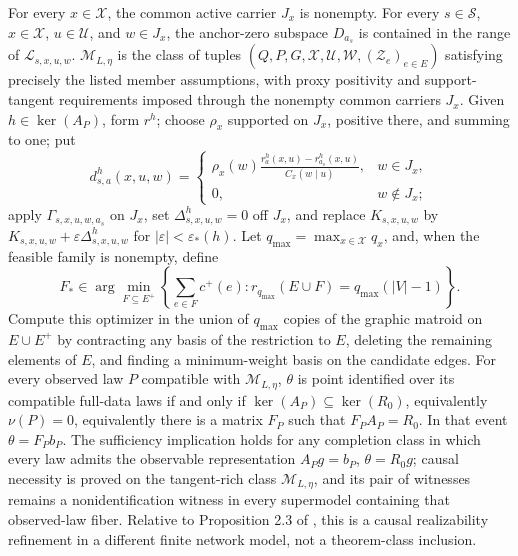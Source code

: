 For every \(x\in\mathcal X\), the common active carrier \(J_x\) is nonempty.
For every \(s\in\mathcal S\), \(x\in\mathcal X\), \(u\in\mathcal U\), and \(w\in J_x\), the anchor-zero subspace \(D_{a_s}\) is contained in the range of \(\mathscr L_{s,x,u,w}\).
\(\mathcal M_{L,\eta}\) is the class of tuples \((Q,P,G,\mathcal X,\mathcal U,\mathcal W,(\mathcal Z_e)_{e\in E})\) satisfying precisely the listed member assumptions, with proxy positivity and support-tangent requirements imposed through the nonempty common carriers \(J_x\).
Given \(h\in\ker(A_P)\), form \(r^h\); choose \(\rho_x\) supported on \(J_x\), positive there, and summing to one; put
\[
d^h_{s,a}(x,u,w)=
\begin{cases}
\displaystyle \rho_x(w)\frac{r^h_a(x,u)-r^h_{a_s}(x,u)}{C_x(w\mid u)},&w\in J_x,\\
0,&w\notin J_x;
\end{cases}
\]
apply \(\Gamma_{s,x,u,w,a_s}\) on \(J_x\), set \(\Delta^h_{s,x,u,w}=0\) off \(J_x\), and replace \(K_{s,x,u,w}\) by \(K_{s,x,u,w}+\varepsilon\Delta^h_{s,x,u,w}\) for \(|\varepsilon|<\varepsilon_*(h)\).
Let \(q_{\max}=\max_{x\in\mathcal X}q_x\), and, when the feasible family is nonempty, define
\[
F_*\in\arg\min_{F\subseteq E^+}
\left\{\sum_{e\in F}c^+(e):
r_{q_{\max}}(E\cup F)=q_{\max}(|V|-1)\right\}.
\]
Compute this optimizer in the union of \(q_{\max}\) copies of the graphic matroid on \(E\cup E^+\) by contracting any basis of the restriction to \(E\), deleting the remaining elements of \(E\), and finding a minimum-weight basis on the candidate edges.
For every observed law \(P\) compatible with \(\mathcal M_{L,\eta}\), \(\theta\) is point identified over its compatible full-data laws if and only if \(\ker(A_P)\subseteq\ker(R_0)\), equivalently \(\nu(P)=0\), equivalently there is a matrix \(F_P\) such that \(F_PA_P=R_0\).  In that event \(\theta=F_Pb_P\).  The sufficiency implication holds for any completion class in which every law admits the observable representation \(A_Pg=b_P\), \(\theta=R_0g\); causal necessity is proved on the tangent-rich class \(\mathcal M_{L,\eta}\), and its pair of witnesses remains a nonidentification witness in every supermodel containing that observed-law fiber.  Relative to Proposition 2.3 of \cite{ZhangLiMiaoTchetgen2023}, this is a causal realizability refinement in a different finite network model, not a theorem-class inclusion.

